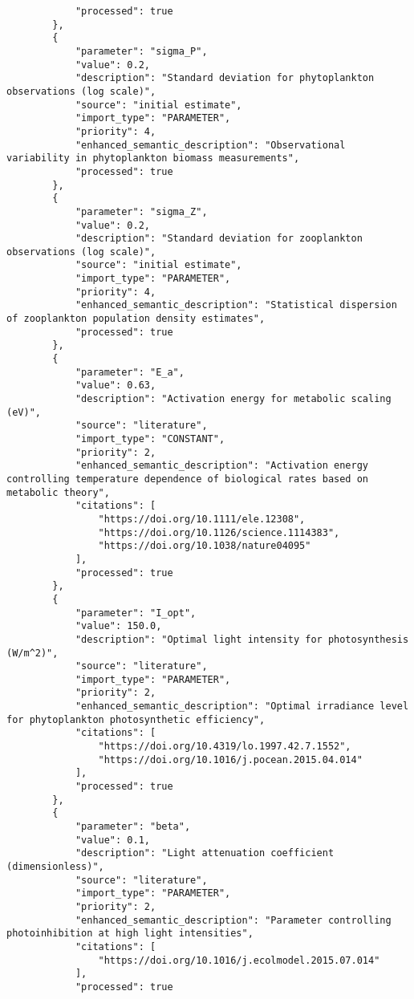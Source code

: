 \begin{lstlisting}
            "processed": true
        },
        {
            "parameter": "sigma_P",
            "value": 0.2,
            "description": "Standard deviation for phytoplankton observations (log scale)",
            "source": "initial estimate",
            "import_type": "PARAMETER",
            "priority": 4,
            "enhanced_semantic_description": "Observational variability in phytoplankton biomass measurements",
            "processed": true
        },
        {
            "parameter": "sigma_Z",
            "value": 0.2,
            "description": "Standard deviation for zooplankton observations (log scale)",
            "source": "initial estimate",
            "import_type": "PARAMETER",
            "priority": 4,
            "enhanced_semantic_description": "Statistical dispersion of zooplankton population density estimates",
            "processed": true
        },
        {
            "parameter": "E_a",
            "value": 0.63,
            "description": "Activation energy for metabolic scaling (eV)",
            "source": "literature",
            "import_type": "CONSTANT",
            "priority": 2,
            "enhanced_semantic_description": "Activation energy controlling temperature dependence of biological rates based on metabolic theory",
            "citations": [
                "https://doi.org/10.1111/ele.12308",
                "https://doi.org/10.1126/science.1114383",
                "https://doi.org/10.1038/nature04095"
            ],
            "processed": true
        },
        {
            "parameter": "I_opt",
            "value": 150.0,
            "description": "Optimal light intensity for photosynthesis (W/m^2)",
            "source": "literature",
            "import_type": "PARAMETER",
            "priority": 2,
            "enhanced_semantic_description": "Optimal irradiance level for phytoplankton photosynthetic efficiency",
            "citations": [
                "https://doi.org/10.4319/lo.1997.42.7.1552",
                "https://doi.org/10.1016/j.pocean.2015.04.014"
            ],
            "processed": true
        },
        {
            "parameter": "beta",
            "value": 0.1,
            "description": "Light attenuation coefficient (dimensionless)",
            "source": "literature",
            "import_type": "PARAMETER",
            "priority": 2,
            "enhanced_semantic_description": "Parameter controlling photoinhibition at high light intensities",
            "citations": [
                "https://doi.org/10.1016/j.ecolmodel.2015.07.014"
            ],
            "processed": true

\end{lstlisting}
